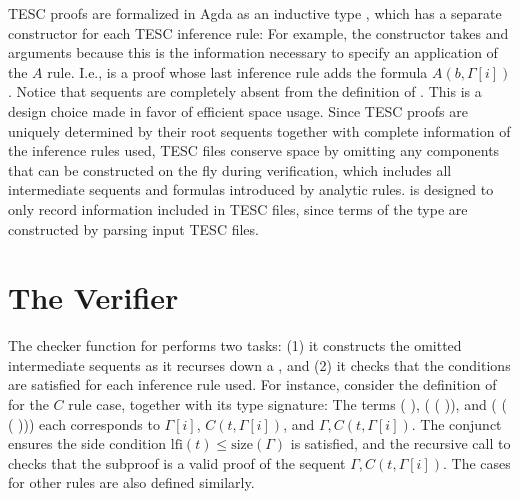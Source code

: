 \documentclass{lipics-v2021}
\newcommand{\lfi}[0]{\mathrm{lfi}}
\newcommand{\size}[0]{\mathrm{size}}
\begin{document}
TESC proofs are formalized in Agda as an inductive type ,
which has a separate constructor for each TESC inference rule: 
For example, the constructor  takes  
 and  arguments because this is the 
information necessary to specify an application of the $A$ rule. I.e.,  
    
is a proof whose last inference rule adds the formula $A(b, \Gamma[i])$. 
Notice that sequents are completely absent from the definition of .
This is a design choice made in favor of efficient space usage. Since TESC proofs are uniquely 
determined by their root sequents together with complete information of the inference rules used,
TESC files conserve space by omitting any components that can be constructed on the fly during 
verification, which includes all intermediate sequents and formulas introduced by analytic rules. 
 is designed to only record information included in TESC files, 
since terms of the type  are constructed by parsing input TESC files.



\section{The Verifier} \label{sec:verifier} 

The checker function  for  performs two tasks: 
(1) it constructs the omitted intermediate sequents as it recurses down a , and 
(2) it checks that the conditions are satisfied for each inference rule used. For instance, 
consider the definition of  for the $C$ rule case, together with  
its type signature:
The terms (  ),  
(  (  )),  
and (  (  (  )))
each corresponds to $\Gamma[i]$, $C(t, \Gamma[i])$, and $\Gamma, C(t, \Gamma[i])$.
The conjunct 
ensures the side condition $\lfi(t) \le \size(\Gamma)$ is satisfied, and the recursive call to 
 checks that the subproof  is a valid proof of
the sequent $\Gamma, C(t, \Gamma[i])$. The cases for other rules are also defined similarly.
\end{document}
